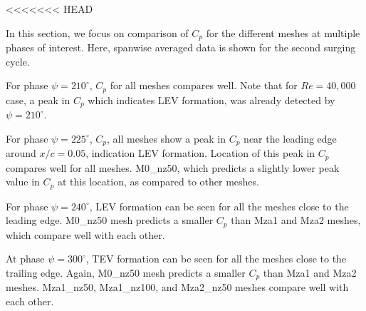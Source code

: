 <<<<<<< HEAD

In this section, we focus on comparison of $C_p$ for the different meshes at multiple phases of interest.
Here, spanwise averaged data is shown for the second surging cycle.

For phase $\psi=210^\circ$, $C_p$ for all meshes compares well. Note that for $Re=40,000$ case, a peak in $C_p$ which indicates LEV formation, was already detected by $\psi=210^\circ$. 

For phase $\psi=225^\circ$, $C_p$, all meshes show a peak in $C_p$ near the leading edge around $x/c = 0.05$, indication LEV formation.
Location of this peak in $C_p$ compares well for all meshes.
M0\_nz50, which predicts a slightly lower peak value in $C_p$ at this location, as compared to other meshes.

For phase $\psi=240^\circ$, LEV formation can be seen for all the meshes close to the leading edge.
M0\_nz50 mesh predicts a smaller $C_p$ than Mza1 and Mza2 meshes, which compare well with each other.

At phase $\psi=300^\circ$, TEV formation can be seen for all the meshes close to the trailing edge.
Again, M0\_nz50 mesh predicts a smaller $C_p$ than Mza1 and Mza2 meshes.
Mza1\_nz50, Mza1\_nz100, and Mza2\_nz50 meshes compare well with each other.


